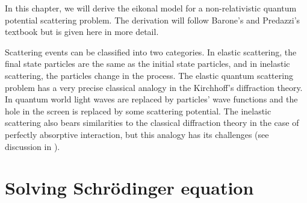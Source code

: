 \documentclass[a4paper, twoside, english, 12pt]{report}
\begin{document}
In this chapter, we will derive the eikonal model for a non-relativistic quantum potential scattering problem. The derivation will follow Barone's and Predazzi's textbook \cite{barpred} but is given here in more detail.

Scattering events can be classified into two categories. In elastic scattering, the final state particles are the same as the initial state particles, and in inelastic scattering, the particles change in the process. The elastic quantum scattering problem has a very precise classical analogy in the Kirchhoff's diffraction theory. In quantum world light waves are replaced by particles' wave functions and the hole in the screen is replaced by some scattering potential. The inelastic scattering also bears similarities to the classical diffraction theory in the case of perfectly absorptive interaction, but this analogy has its challenges (see discussion in \cite{barpred, amaldi}).


\section{Solving Schrödinger equation}\label{SS:schrode}
\end{document}
